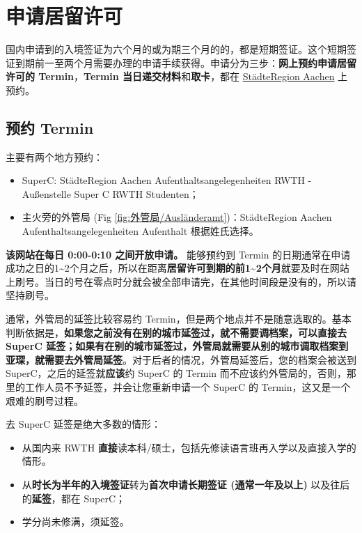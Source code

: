 \section{申请居留许可}\label{sec:申请居留许可}

  国内申请到的入境签证为六个月的或为期三个月的的，都是短期签证。这个短期签证到期前一至两个月需要办理的申请手续获得。申请分为三步：\textbf{网上预约申请居留许可的 Termin}，\textbf{Termin 当日递交材料}和\textbf{取卡}，都在 \href{https://termine.staedteregion-aachen.de/auslaenderamt/}{StädteRegion Aachen} 上预约。

  \subsection{预约 Termin}\label{subsec:预约 Termin}

    主要有两个地方预约：

    \begin{itemize}
      \item SuperC: StädteRegion Aachen \MVRightarrow{} Aufenthaltsangelegenheiten \MVRightarrow{} RWTH - Außenstelle Super C \MVRightarrow{} RWTH Studenten；
      \item 主火旁的外管局 (Fig \ref{fig:外管局/Ausländeramt})：StädteRegion Aachen \MVRightarrow{} Aufenthaltsangelegenheiten \MVRightarrow{} Aufenthalt 根据姓氏选择。
    \end{itemize}

    \textbf{该网站在每日 0:00-0:10 之间开放申请。} 能够预约到 Termin 的日期通常在申请成功之日的1\textasciitilde2个月之后，所以在距离\textbf{居留许可到期的前1\textasciitilde2个月}就要及时在网站上刷号。当日的号在零点时分就会被全部申请完，在其他时间段是没有的，所以请坚持刷号。

    通常，外管局的延签比较容易约 Termin，但是两个地点并不是随意选取的。基本判断依据是，\textbf{如果您之前没有在别的城市延签过，就不需要调档案，可以直接去 SuperC 延签；如果有在别的城市延签过，外管局就需要从别的城市调取档案到亚琛，就需要去外管局延签}。对于后者的情况，外管局延签后，您的档案会被送到 SuperC，之后的延签就\textbf{应该}约 SuperC 的 Termin 而不应该约外管局的，否则，那里的工作人员不予延签，并会让您重新申请一个 SuperC 的 Termin，这又是一个艰难的刷号过程。

    去 SuperC 延签是绝大多数的情形：

    \begin{itemize}
      \item 从国内来 RWTH \textbf{直接}读本科/硕士，包括先修读语言班再入学以及直接入学的情形。
      \item 从\textbf{时长为半年的入境签证}转为\textbf{首次申请长期签证 (通常一年及以上)} 以及往后的\textbf{延签}，都在 SuperC；
      \item 学分尚未修满，须延签。
    \end{itemize}

